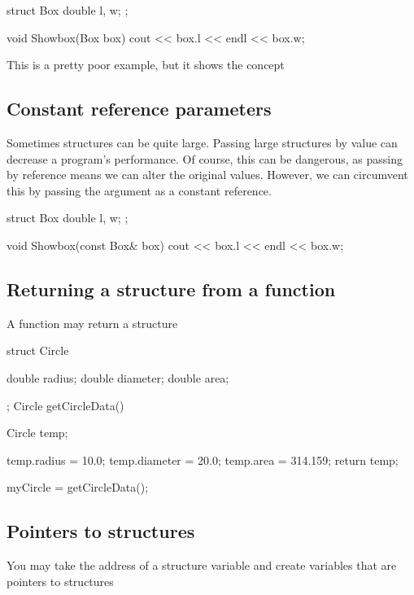 \documentclass{report}
\begin{document}
	\begin{cppcode}
struct Box {
    double l, w;
};

void Showbox(Box box) {
    cout << box.l << endl << box.w;
}
	\end{cppcode}
	
	
	\bigbreak \noindent 
	\begin{notebox}
			This is a pretty poor example, but it shows the concept
	\end{notebox}
	\bigbreak \noindent 

	\pagebreak \bigbreak \noindent 
	\subsection{Constant reference parameters}
	\bigbreak \noindent 
	\begin{concept}
	   Sometimes structures can be quite large. Passing large structures by value can decrease a program's performance. Of course, this can be dangerous, as passing by reference means we can alter the original values. However, we can circumvent this by passing the argument as a constant reference.
	\end{concept}
	\bigbreak \noindent 
	
	\begin{cppcode}
struct Box {
    double l, w;
};

void Showbox(const Box& box) {
    cout << box.l << endl << box.w;
}
	\end{cppcode}
	

	\bigbreak \noindent 
	\subsection{Returning a structure from a function}
	\bigbreak \noindent 
	\begin{concept}
	   A function may return a structure 
	\end{concept}
	\bigbreak \noindent 
	
	\begin{cppcode}
struct Circle {
    double radius;
    double diameter;
    double area;

};
Circle getCircleData() {
    Circle temp;

    temp.radius = 10.0;
    temp.diameter = 20.0;
    temp.area = 314.159;
    return temp;
}
myCircle = getCircleData();
	\end{cppcode}
	

	\pagebreak \bigbreak \noindent 
	\subsection{Pointers to structures}
	\bigbreak \noindent 
	\begin{concept}
	   You may take the address of a structure variable and create variables that are pointers to structures 
	\end{concept}
	\bigbreak \noindent 
	
\end{document}
